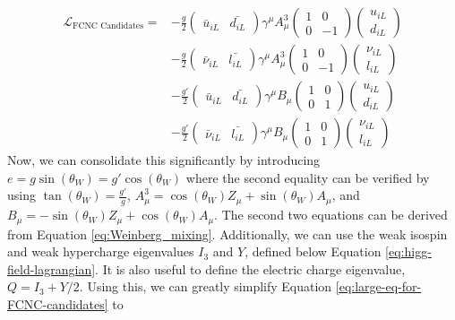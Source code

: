 \begin{equation}
\begin{split}
\mathcal{L}_{\text{FCNC Candidates}} = &-\frac{g}{2}\begin{pmatrix}
\bar{u}_{iL} & \bar{d_{iL}}
\end{pmatrix} \gamma^\mu A_{\mu}^3 \begin{pmatrix}
1 & 0 \\ 0 & -1
\end{pmatrix} \begin{pmatrix}
u_{iL} \\ d_{iL}
\end{pmatrix} \\
&-\frac{g}{2}\begin{pmatrix}
\bar{\nu}_{iL} & \bar{l_{iL}}
\end{pmatrix} \gamma^\mu A_{\mu}^3 \begin{pmatrix}
1 & 0 \\ 0 & -1
\end{pmatrix} \begin{pmatrix}
\nu_{iL} \\ l_{iL}
\end{pmatrix} \\
&-\frac{g'}{2}\begin{pmatrix}
\bar{u}_{iL} & \bar{d_{iL}}
\end{pmatrix} \gamma^\mu B_{\mu} \begin{pmatrix}
1 & 0 \\ 0 & 1
\end{pmatrix} \begin{pmatrix}
u_{iL} \\ d_{iL}
\end{pmatrix} \\
&-\frac{g'}{2}\begin{pmatrix}
\bar{\nu}_{iL} & \bar{l_{iL}}
\end{pmatrix} \gamma^\mu B_{\mu} \begin{pmatrix}
1 & 0 \\ 0 & 1
\end{pmatrix} \begin{pmatrix}
\nu_{iL} \\ l_{iL}
\end{pmatrix}
\label{eq:large-eq-for-FCNC-candidates}
\end{split}
\end{equation}
Now, we can consolidate this significantly by introducing $e = g\sin(\theta_W) = g'\cos(\theta_W)$ where the second equality can be verified by using $\tan(\theta_W) = \frac{g'}{g}$, $A^3_\mu = \cos(\theta_W)Z_\mu + \sin(\theta_W)A_\mu$, and $B_\mu = -\sin(\theta_W)Z_\mu + \cos(\theta_W) A_\mu$. The second two equations can be derived from Equation \ref{eq:Weinberg_mixing}. Additionally, we can use the weak isospin and weak hypercharge eigenvalues $I_3$ and $Y$, defined below Equation \ref{eq:higg-field-lagrangian}.  It is also useful to define the electric charge eigenvalue, $Q = I_3 + Y/2$. Using this, we can greatly simplify Equation \ref{eq:large-eq-for-FCNC-candidates} to

